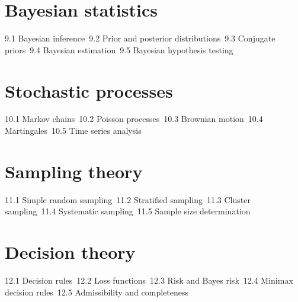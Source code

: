 \section{Bayesian statistics}
9.1 Bayesian inference\
9.2 Prior and posterior distributions\
9.3 Conjugate priors\
9.4 Bayesian estimation\
9.5 Bayesian hypothesis testing\
\section{Stochastic processes}
10.1 Markov chains\
10.2 Poisson processes\
10.3 Brownian motion\
10.4 Martingales\
10.5 Time series analysis\
\section{Sampling theory}
11.1 Simple random sampling\
11.2 Stratified sampling\
11.3 Cluster sampling\
11.4 Systematic sampling\
11.5 Sample size determination\
\section{Decision theory}
12.1 Decision rules\
12.2 Loss functions\
12.3 Risk and Bayes risk\
12.4 Minimax decision rules\
12.5 Admissibility and completeness\
